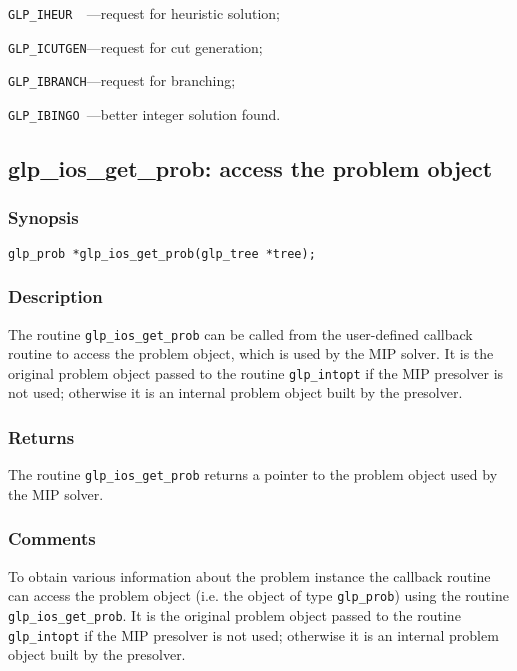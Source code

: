\verb|GLP_IHEUR  |---request for heuristic solution;

\verb|GLP_ICUTGEN|---request for cut generation;

\verb|GLP_IBRANCH|---request for branching;

\verb|GLP_IBINGO |---better integer solution found.

\subsection{glp\_ios\_get\_prob: access the problem object}

\subsubsection*{Synopsis}

\begin{verbatim}
glp_prob *glp_ios_get_prob(glp_tree *tree);
\end{verbatim}

\subsubsection*{Description}

The routine \verb|glp_ios_get_prob| can be called from the user-defined
callback routine to access the problem object, which is used by the MIP
solver. It is the original problem object passed to the routine
\verb|glp_intopt| if the MIP presolver is not used; otherwise it is an
internal problem object built by the presolver.

\subsubsection*{Returns}

The routine \verb|glp_ios_get_prob| returns a pointer to the problem
object used by the MIP solver.

\subsubsection*{Comments}

To obtain various information about the problem instance the callback
routine can access the problem object (i.e. the object of type
\verb|glp_prob|) using the routine \verb|glp_ios_get_prob|. It is the
original problem object passed to the routine \verb|glp_intopt| if the
MIP presolver is not used; otherwise it is an internal problem object
built by the presolver.

